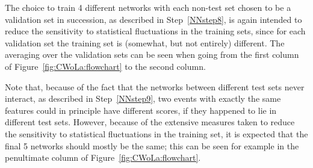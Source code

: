 The choice to train 4 different networks with each non-test set chosen to be a validation set in succession, as described in Step~\ref{NNstep8}, is again intended to reduce the sensitivity to statistical fluctuations in the training sets, since for each validation set the training set is (somewhat, but not entirely) different.
The averaging over the validation sets can be seen when going from the first column of Figure~\ref{fig:CWoLa:flowchart} to the second column.


Note that, because of the fact that the networks between different test sets never interact, as described in Step~\ref{NNstep9}, two events with exactly the same features could in principle have different scores, if they happened to lie in different test sets.
However, because of the extensive measures taken to reduce the sensitivity to statistical fluctuations in the training set, it is expected that the final 5 networks should mostly be the same; this can be seen for example in the penultimate column of Figure~\ref{fig:CWoLa:flowchart}.

